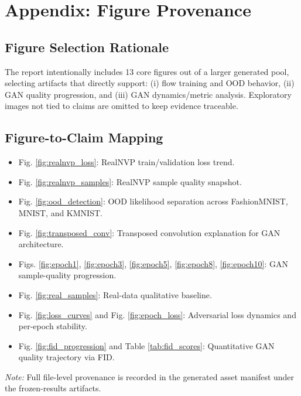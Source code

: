 \documentclass[conference,12pt]{IEEEtran}
\begin{document}
\section{Appendix: Figure Provenance}
\subsection{Figure Selection Rationale}
The report intentionally includes 13 core figures out of a larger generated pool, selecting artifacts that directly support: (i) flow training and OOD behavior, (ii) GAN quality progression, and (iii) GAN dynamics/metric analysis. Exploratory images not tied to claims are omitted to keep evidence traceable.

\subsection{Figure-to-Claim Mapping}
\begin{itemize}
    \item Fig. \ref{fig:realnvp_loss}: RealNVP train/validation loss trend.
    \item Fig. \ref{fig:realnvp_samples}: RealNVP sample quality snapshot.
    \item Fig. \ref{fig:ood_detection}: OOD likelihood separation across FashionMNIST, MNIST, and KMNIST.
    \item Fig. \ref{fig:transposed_conv}: Transposed convolution explanation for GAN architecture.
    \item Figs. \ref{fig:epoch1}, \ref{fig:epoch3}, \ref{fig:epoch5}, \ref{fig:epoch8}, \ref{fig:epoch10}: GAN sample-quality progression.
    \item Fig. \ref{fig:real_samples}: Real-data qualitative baseline.
    \item Fig. \ref{fig:loss_curves} and Fig. \ref{fig:epoch_loss}: Adversarial loss dynamics and per-epoch stability.
    \item Fig. \ref{fig:fid_progression} and Table \ref{tab:fid_scores}: Quantitative GAN quality trajectory via FID.
\end{itemize}
\vspace{1mm}
\noindent\textit{Note:} Full file-level provenance is recorded in the generated asset manifest under the frozen-results artifacts.
\end{document}
